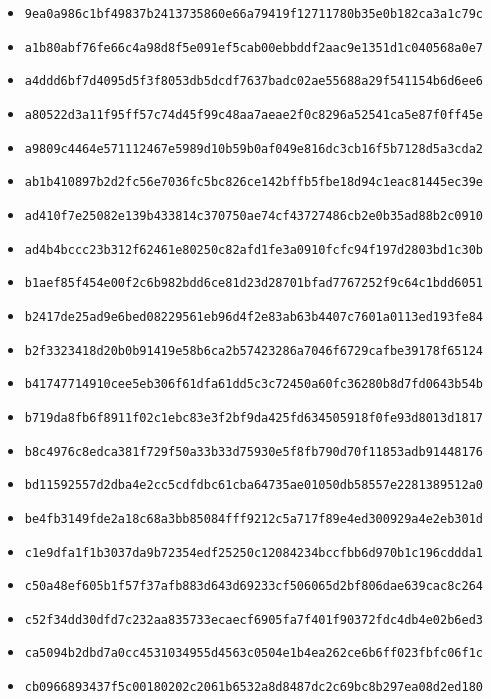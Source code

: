 {\begin{itemize}
    \item \texttt{9ea0a986c1bf49837b2413735860e66a79419f12711780b35e0b182ca3a1c79c}
    \item \texttt{a1b80abf76fe66c4a98d8f5e091ef5cab00ebbddf2aac9e1351d1c040568a0e7}
    \item \texttt{a4ddd6bf7d4095d5f3f8053db5dcdf7637badc02ae55688a29f541154b6d6ee6}
    \item \texttt{a80522d3a11f95ff57c74d45f99c48aa7aeae2f0c8296a52541ca5e87f0ff45e}
    \item \texttt{a9809c4464e571112467e5989d10b59b0af049e816dc3cb16f5b7128d5a3cda2}
    \item \texttt{ab1b410897b2d2fc56e7036fc5bc826ce142bffb5fbe18d94c1eac81445ec39e}
    \item \texttt{ad410f7e25082e139b433814c370750ae74cf43727486cb2e0b35ad88b2c0910}
    \item \texttt{ad4b4bccc23b312f62461e80250c82afd1fe3a0910fcfc94f197d2803bd1c30b}
    \item \texttt{b1aef85f454e00f2c6b982bdd6ce81d23d28701bfad7767252f9c64c1bdd6051}
    \item \texttt{b2417de25ad9e6bed08229561eb96d4f2e83ab63b4407c7601a0113ed193fe84}
    \item \texttt{b2f3323418d20b0b91419e58b6ca2b57423286a7046f6729cafbe39178f65124}
    \item \texttt{b41747714910cee5eb306f61dfa61dd5c3c72450a60fc36280b8d7fd0643b54b}
    \item \texttt{b719da8fb6f8911f02c1ebc83e3f2bf9da425fd634505918f0fe93d8013d1817}
    \item \texttt{b8c4976c8edca381f729f50a33b33d75930e5f8fb790d70f11853adb91448176}
    \item \texttt{bd11592557d2dba4e2cc5cdfdbc61cba64735ae01050db58557e2281389512a0}
    \item \texttt{be4fb3149fde2a18c68a3bb85084fff9212c5a717f89e4ed300929a4e2eb301d}
    \item \texttt{c1e9dfa1f1b3037da9b72354edf25250c12084234bccfbb6d970b1c196cddda1}
    \item \texttt{c50a48ef605b1f57f37afb883d643d69233cf506065d2bf806dae639cac8c264}
    \item \texttt{c52f34dd30dfd7c232aa835733ecaecf6905fa7f401f90372fdc4db4e02b6ed3}
    \item \texttt{ca5094b2dbd7a0cc4531034955d4563c0504e1b4ea262ce6b6ff023fbfc06f1c}
    \item \texttt{cb0966893437f5c00180202c2061b6532a8d8487dc2c69bc8b297ea08d2ed180}

\end{itemize}}
